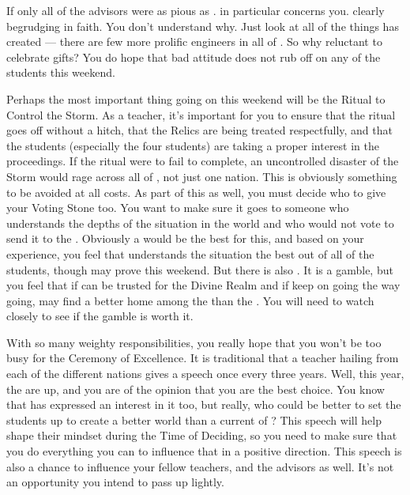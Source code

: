 \documentclass[char]{GL2020}
\begin{document}
If only all of the advisors were as pious as \cEbbPriest{}. \cBunker{\full} in particular concerns you. \cBunker{\They} \cBunker{\are} clearly begrudging in \cBunker{\their} faith. You don't understand why. Just look at all of the things \cBunker{} has created — there are few more prolific engineers in all of \pEarth{}. So why \cBunker{\are} \cBunker{\they} reluctant to celebrate \cBunker{\their} gifts? You do hope that \cBunker{\their} bad attitude does not rub off on any of the students this weekend.

Perhaps the most important thing going on this weekend will be the Ritual to Control the Storm. As a teacher, it's important for you to ensure that the ritual goes off without a hitch, that the Relics are being treated respectfully, and that the students (especially the four \pShip{} students) are taking a proper interest in the proceedings. If the ritual were to fail to complete, an uncontrolled disaster of the Storm would rage across all of \pEarth{}, not just one nation. This is obviously something to be avoided at all costs. As part of this as well, you must decide who to give your Voting Stone too. You want to make sure it goes to someone who understands the depths of the situation in the world and who would not vote to send it to the \pShip{}. Obviously a \pShippie{} would be the best for this, and based on your experience, you feel that \cWarlordDaughter{} understands the situation the best out of all of the students, though \cInitiate{} may prove \cInitiate{\themself} this weekend. But there is also \cAmbition{}. It is a gamble, but you feel that if \cAmbition{\they} can be trusted for the Divine Realm and if \cAmbition{\they} keep\cAmbition{\verbs} on going the way \cAmbition{\they} \cAmbition{\are} going, \cAmbition{\they} may find a better home among the \pShippies{} than the \pTech{}. You will need to watch \cAmbition{\them} closely to see if the gamble is worth it.  

With so many weighty responsibilities, you really hope that you won't be too busy for the Ceremony of Excellence. It is traditional that a teacher hailing from each of the different nations gives a speech once every three years. Well, this year, the \pShip{} are up, and you are of the opinion that you are the best choice. You know that \cPirate{} has expressed an interest in it too, but really, who could be better to set the students up to create a better world than a current \cFlowPriest{\cleric} of \cFlowFull{\full}? This speech will help shape their mindset during the Time of Deciding, so you need to make sure that you do everything you can to influence that in a positive direction. This speech is also a chance to influence your fellow teachers, and the advisors as well. It's not an opportunity you intend to pass up lightly.
\end{document}
